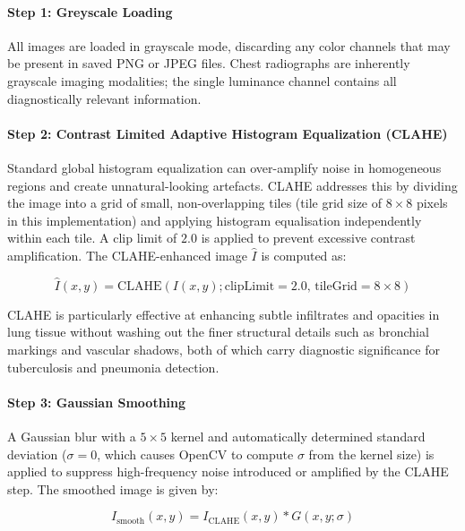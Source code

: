 \paragraph{Step 1: Greyscale Loading}
All images are loaded in grayscale mode, discarding any color channels that may be present in saved PNG or JPEG files. Chest radiographs are inherently grayscale imaging modalities; the single luminance channel contains all diagnostically relevant information.

\paragraph{Step 2: Contrast Limited Adaptive Histogram Equalization (CLAHE)}
Standard global histogram equalization can over-amplify noise in homogeneous regions and create unnatural-looking artefacts. CLAHE addresses this by dividing the image into a grid of small, non-overlapping tiles (tile grid size of $8 \times 8$ pixels in this implementation) and applying histogram equalisation independently within each tile. A clip limit of $2.0$ is applied to prevent excessive contrast amplification. The CLAHE-enhanced image $\hat{I}$ is computed as:

\begin{equation}
	\hat{I}(x,y) =
	\mathrm{CLAHE}
	\left(
	I(x,y);
	\text{clipLimit}=2.0,\,
	\text{tileGrid}=8 \times 8
	\right)
	\label{eq:clahe}
\end{equation}

CLAHE is particularly effective at enhancing subtle infiltrates and opacities in lung tissue without washing out the finer structural details such as bronchial markings and vascular shadows, both of which carry diagnostic significance for tuberculosis and pneumonia detection.

\paragraph{Step 3: Gaussian Smoothing}
A Gaussian blur with a $5 \times 5$ kernel and automatically determined standard deviation ($\sigma = 0$, which causes OpenCV to compute $\sigma$ from the kernel size) is applied to suppress high-frequency noise introduced or amplified by the CLAHE step. The smoothed image is given by:

\begin{equation}
	I_{\mathrm{smooth}}(x,y)
	=
	I_{\mathrm{CLAHE}}(x,y) * G(x,y;\sigma)
	\label{eq:gaussian_blur}
\end{equation}

